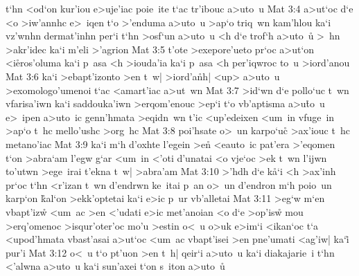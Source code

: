 t`hn
<od`on
kur'iou
e>uje'iac
poie~ite
t`ac
tr'ibouc
a>uto~u\bibvsend
\vs Mat 3:4
a>ut`oc
d`e
<o
>iw'annhc
e>~iqen
t`o
>'enduma
a>uto~u
>ap`o
triq~wn
kam'hlou
ka`i
vz'wnhn
dermat'inhn
per`i
t`hn
>osf`un
a>uto~u
<h
d`e
trof`h
a>uto~u\r{}
>~hn
>akr'idec
ka`i
m'eli
>'agrion\bibvsend
\vs Mat 3:5
t'ote
>exepore'ueto
pr`oc
a>ut`on
<i\r{e}ros'oluma
ka`i
p~asa
<h
>iouda'ia
ka`i
p~asa
<h
per'iqwroc
to~u
>iord'anou\bibvsend
\vs Mat 3:6
ka`i
>ebapt'izonto
>en
t~w|
>iord'a\r{n}h|
<up>
a>uto~u
>exomologo'umenoi
t`ac
<amart'iac
a>ut~wn\bibvsend
\vs Mat 3:7
>id`wn
d`e
pollo`uc
t~wn
vfarisa'iwn
ka`i
saddouka'iwn
>erqom'enouc
>ep`i
t`o
vb'aptisma
a>u\r{t}o~u
e>~ipen
a>uto~ic
genn'hmata
>eqidn~wn
t'ic
<up'edeixen
<um~in
vfuge~in
>ap`o
t~hc
mello'ushc
>org~hc\bibvsend
\vs Mat 3:8
poi'hsate
o>~un
karpo`uc\r{}
>ax'iouc
t~hc
metano'iac\bibvsend
\vs Mat 3:9
ka`i
m`h
d'oxhte
l'egein
>en\r{}
<eauto~ic
pat'era
>'eqomen
t`on
>abra`am
l'egw
g`ar
<um~in
<'oti
d'unatai
<o
vje`oc
>ek
t~wn
l'ijwn
to'utwn
>ege~irai
t'ekna
t~w|
>abra'am\bibvsend
\vs Mat 3:10
>'hdh
d`e
k\r{a}`i
<h
>ax'inh
pr`oc
t`hn
<r'izan
t~wn
d'endrwn
ke~itai
p~an
o>~un
d'endron
m`h
poio~un
karp`on
\r{k}al`on
>ekk'optetai
ka`i
e>ic
p~ur
vb'alletai\bibvsend
\vs Mat 3:11
>eg`w
m`en
vbapt'izw\r{}
<um~ac
>en
<'udati
e>ic
met'anoian
<o
d`e
>op'isw\r{}
mou
>erq'omenoc
>isqur'oter'oc
mo'u
>estin
o<~u
o>uk
e>im`i
<ikan`oc
t`a
<upod'hmata
vbast'asai
a>ut`oc
<um~ac
vbapt'isei
>en
pne'umati
<ag'iw|
ka`i\r{}
pur'i\bibvsend
\vs Mat 3:12
o<~u
t`o
pt'uon
>en
t~h|
qeir`i
a>uto~u
ka`i
diakajarie~i
t`hn
<'alwna
a>uto~u
ka`i
sun'axei
t`on
s~iton
a>uto~u\r{}
